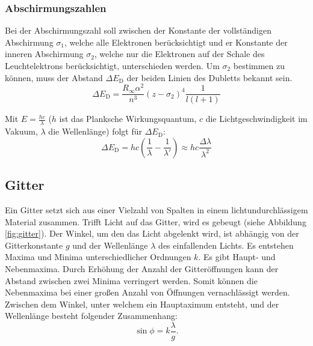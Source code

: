 \subsubsection{Abschirmungszahlen}
Bei der Abschirmungszahl soll zwischen der Konstante der vollständigen Abschirmung $\sigma_1$, welche alle Elektronen berücksichtigt und er Konstante der inneren Abschirmung $\sigma_2$, welche nur die Elektronen auf der Schale des Leuchtelektrons berücksichtigt, unterschieden werden. Um $\sigma_2$ bestimmen zu können, muss der Abstand $\Delta E_\mathrm{D}$ der beiden Linien des Dubletts bekannt sein.
\begin{equation}
  \label{eq:ED1}
  \Delta E_\mathrm{D} = \frac{R_\infty \alpha^2}{n^3}(z-\sigma_2)^4 \frac{1}{l(l+1)}
\end{equation}

Mit $E=\frac{hc}{\lambda}$ ($h$ ist das Planksche Wirkungsquantum, $c$ die Lichtgeschwindigkeit im Vakuum, $\lambda$ die Wellenlänge) folgt für $\Delta E_\mathrm{D}$:
\begin{equation}
  \label{eq:ED2}
\Delta E_\mathrm{D} = hc \left( \frac{1}{\lambda}-\frac{1}{\lambda'}\right) \approx hc \frac{\Delta \lambda}{\lambda^2}
\end{equation}

\subsection{Gitter}
Ein Gitter setzt sich aus einer Vielzahl von Spalten in einem lichtundurchlässigem Material zusammen. Trifft Licht auf das Gitter, wird es gebeugt (siehe Abbildung \ref{fig:gitter}). Der Winkel, um den das Licht abgelenkt wird, ist abhängig von der Gitterkonstante $g$ und der Wellenlänge $\lambda$ des einfallenden Lichts. Es entstehen Maxima und Minima unterschiedlicher Ordnungen $k$.
Es gibt Haupt- und Nebenmaxima. Durch Erhöhung der Anzahl der Gitteröffnungen kann der Abstand zwischen zwei Minima verringert werden. Somit können die Nebenmaxima bei einer großen Anzahl von Öffnungen vernachlässigt werden. Zwischen dem Winkel, unter welchem ein Hauptaximum entsteht, und der Wellenlänge besteht folgender Zusammenhang:
\begin{equation}
  \sin \phi = k\frac{\lambda}{g}.
\end{equation}

